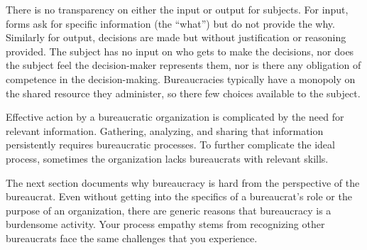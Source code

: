 There is no transparency on either the input or output for subjects. For input, forms ask for specific information (the ``what'') but do not provide the why. Similarly for output, decisions are made but without justification or reasoning provided.
The subject has no input on who gets to make the decisions, nor does the subject feel the decision-maker represents them, nor is there any obligation of competence in the decision-making. Bureaucracies typically have a monopoly on the shared resource they administer, so there few choices available to the subject.



Effective action by a bureaucratic organization is complicated by the need for relevant information. Gathering, analyzing, and sharing that information persistently requires bureaucratic processes. To further complicate the ideal process, sometimes the organization lacks bureaucrats with relevant skills. 


The next section documents why bureaucracy is hard from the perspective of the bureaucrat. Even without getting into the specifics of a bureaucrat's role or the purpose of an organization, there are generic reasons that bureaucracy is a burdensome activity. Your \gls{process empathy} stems from recognizing other bureaucrats face the same challenges that you experience.